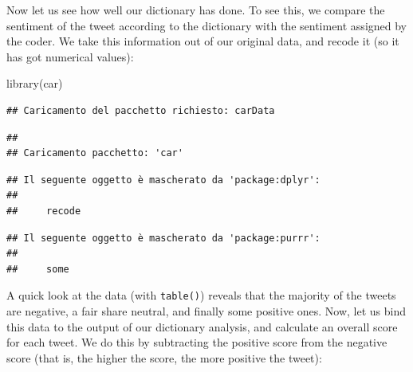 \documentclass[
]{article}
\newenvironment{Shaded}{\begin{snugshade}}{\end{snugshade}}
\newcommand{\FunctionTok}[1]{\textcolor[rgb]{0.00,0.00,0.00}{#1}}
\newcommand{\NormalTok}[1]{#1}
\newcommand{\OtherTok}[1]{\textcolor[rgb]{0.56,0.35,0.01}{#1}}
\newcommand{\SpecialCharTok}[1]{\textcolor[rgb]{0.00,0.00,0.00}{#1}}
\newcommand{\StringTok}[1]{\textcolor[rgb]{0.31,0.60,0.02}{#1}}
\begin{document}
Now let us see how well our dictionary has done. To see this, we compare the sentiment of the tweet according to the dictionary with the sentiment assigned by the coder. We take this information out of our original data, and recode it (so it has got numerical values):

\begin{Shaded}
\begin{Highlighting}[]
\FunctionTok{library}\NormalTok{(car)}
\end{Highlighting}
\end{Shaded}

\begin{verbatim}
## Caricamento del pacchetto richiesto: carData
\end{verbatim}

\begin{verbatim}
## 
## Caricamento pacchetto: 'car'
\end{verbatim}

\begin{verbatim}
## Il seguente oggetto è mascherato da 'package:dplyr':
## 
##     recode
\end{verbatim}

\begin{verbatim}
## Il seguente oggetto è mascherato da 'package:purrr':
## 
##     some
\end{verbatim}

\begin{Shaded}
\end{Shaded}

A quick look at the data (with \texttt{table()}) reveals that the majority of the tweets are negative, a fair share neutral, and finally some positive ones. Now, let us bind this data to the output of our dictionary analysis, and calculate an overall score for each tweet. We do this by subtracting the positive score from the negative score (that is, the higher the score, the more positive the tweet):
\end{document}
